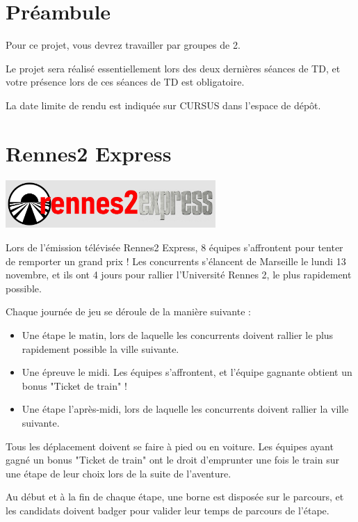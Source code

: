 \documentclass[11pt,a4paper]{article}
\begin{document}
\section{Préambule}

Pour ce projet, vous devrez travailler par groupes de 2.

Le projet sera réalisé essentiellement lors des deux dernières séances de TD, et votre présence lors de ces séances de TD est obligatoire.

La date limite de rendu est indiquée sur CURSUS dans l’espace de dépôt.

\section{Rennes2 Express}
\begin{center}
\includegraphics[width=8cm]{ProjetRennes2Express/logo.jpg}
\end{center}
Lors de l'émission télévisée Rennes2 Express, 8 équipes s'affrontent pour tenter de remporter un grand prix !
Les concurrents s'élancent de Marseille le lundi 13 novembre, et ils ont 4 jours pour rallier l'Université Rennes 2, le plus rapidement possible.

Chaque journée de jeu se déroule de la manière suivante :
\begin{itemize}
    \item Une étape le matin, lors de laquelle les concurrents doivent rallier le plus rapidement possible la ville suivante.
    \item Une épreuve le midi. Les équipes s'affrontent, et l'équipe gagnante obtient un bonus "Ticket de train" !
    \item Une étape l'après-midi, lors de laquelle les concurrents doivent rallier la ville suivante.
\end{itemize}

Tous les déplacement doivent se faire à pied ou en voiture. Les équipes ayant gagné un bonus "Ticket de train" ont le droit 
d'emprunter une fois le train sur une étape de 
leur choix lors de la suite de l'aventure. 

Au début et à la fin de chaque étape, une borne est disposée sur le parcours, et les candidats doivent badger pour valider leur temps de parcours de l'étape.
\end{document}
